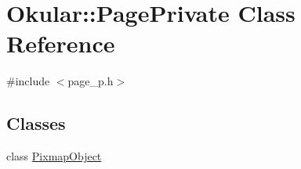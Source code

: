 \hypertarget{classOkular_1_1PagePrivate}{\section{Okular\+:\+:Page\+Private Class Reference}
\label{classOkular_1_1PagePrivate}
}


{\ttfamily \#include $<$page\+\_\+p.\+h$>$}

\subsection*{Classes}
\begin{DoxyCompactItemize}
\item 
class \hyperlink{classOkular_1_1PagePrivate_1_1PixmapObject}{Pixmap\+Object}
\end{DoxyCompactItemize}
